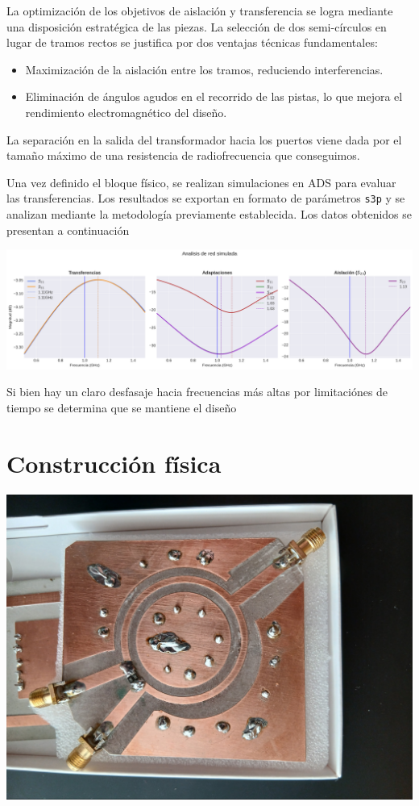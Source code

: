 \documentclass[a4paper, 12pt]{article}
\begin{document}
La optimización de los objetivos de aislación y transferencia se logra mediante una disposición estratégica de las piezas. La selección de dos semi-círculos en lugar de tramos rectos se justifica por dos ventajas técnicas fundamentales:
\begin{itemize}
    \item Maximización de la aislación entre los tramos, reduciendo interferencias.
    \item Eliminación de ángulos agudos en el recorrido de las pistas, lo que mejora el rendimiento electromagnético del diseño.
\end{itemize}
La separación en la salida del transformador hacia los puertos viene dada por el tamaño máximo de una resistencia de radiofrecuencia que conseguimos.

Una vez definido el bloque físico, se realizan simulaciones en ADS para evaluar las transferencias. Los resultados se exportan en formato de parámetros \texttt{s3p} y se analizan mediante la metodología previamente establecida. Los datos obtenidos se presentan a continuación

\includegraphics[width=0.9\linewidth]{./img/plot-simulado.png}

Si bien hay un claro desfasaje hacia frecuencias más altas por limitaciónes de tiempo se determina que se mantiene el diseño

\section*{Construcción física}

\begin{center}
\includegraphics[width=0.7\linewidth]{./img/real.jpg}
\end{center}
\end{document}
